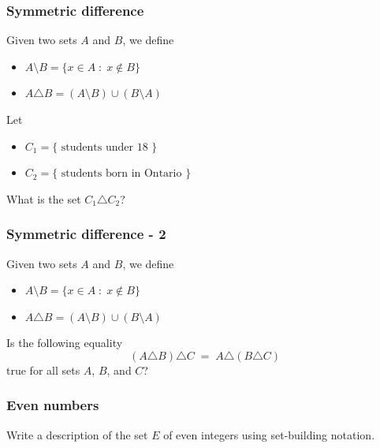\documentclass[14pt]{beamer}
\begin{document}
\begin{frame}
	\frametitle{Symmetric difference}

	Given two sets $A$ and $B$, we define
	\begin{itemize}
		\item $A \setminus B = \{ x \in A \; : \; x \notin B \}$

		\item $A \triangle B = (A \setminus B) \cup (B \setminus A)$
	\end{itemize}

	\vfill

	Let
	\begin{itemize}
		\item $C_{1}= \{ \text{ students under 18 }\}$

		\item $C_{2}= \{ \text{ students born in Ontario }\}$
	\end{itemize}

	\vfill

	What is the set $C_{1}\triangle C_{2}$?

	\vfill
\end{frame}

\begin{frame}
	\frametitle{Symmetric difference - 2}

	Given two sets $A$ and $B$, we define
	\begin{itemize}
		\item $A \setminus B = \{ x \in A \; : \; x \notin B \}$

		\item $A \triangle B = (A \setminus B) \cup (B \setminus A)$
	\end{itemize}

	\vfill

	Is the following equality
	\[
		(A \triangle B) \triangle C \; = \; A \triangle (B \triangle C)
	\]
	true for all sets $A$, $B$, and $C$?

	\vfill
\end{frame}

\begin{frame}[t]
	\frametitle{Even numbers}

	Write a description of the set $E$ of even integers using set-building
	notation.
\end{frame}
\end{document}
